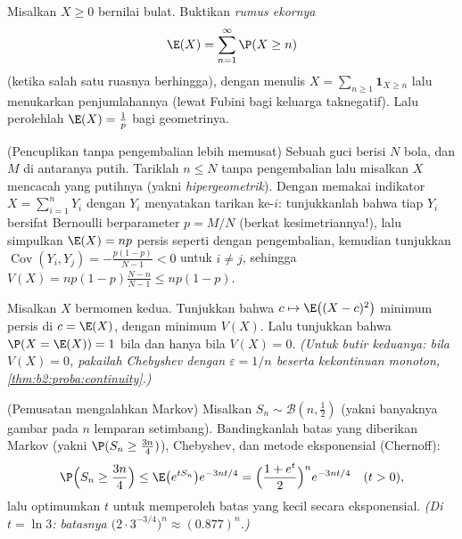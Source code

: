 \begin{exercise}[$\star\star$]\label{exo:b2:randomvar:4}
Misalkan $X \geq 0$ bernilai bulat. Buktikan \emph{rumus ekornya}
\[
\E(X) = \sum_{n=1}^{\infty} \P(X \geq n)
\]
(ketika salah satu ruasnya berhingga), dengan menulis $X =
\sum_{n\geq1}\mathbf{1}_{X \geq n}$ lalu menukarkan penjumlahannya
(lewat Fubini bagi keluarga taknegatif). Lalu perolehlah $\E(X) = \frac1p$ bagi
 geometrinya.
\end{exercise}

\begin{exercise}[$\star\star$]\label{exo:b2:randomvar:5}
(Pencuplikan tanpa pengembalian lebih memusat) Sebuah guci berisi $N$
bola, dan $M$ di antaranya putih. Tariklah $n \leq N$ tanpa pengembalian lalu
misalkan $X$ mencacah yang putihnya (yakni  \emph{hipergeometrik}). Dengan memakai
indikator $X = \sum_{i=1}^n Y_i$ dengan $Y_i$ menyatakan tarikan ke-$i$:
tunjukkanlah bahwa tiap $Y_i$ bersifat Bernoulli berparameter $p = M/N$ (berkat kesimetriannya!),
lalu simpulkan $\E(X) = np$ persis seperti dengan pengembalian, kemudian tunjukkan
$\operatorname{Cov}(Y_i, Y_j) = -\frac{p(1-p)}{N-1} < 0$ untuk $i
\neq j$, sehingga $V(X) = np(1-p)\frac{N - n}{N - 1} \leq np(1-p)$.
\end{exercise}

\begin{exercise}[$\star\star$]\label{exo:b2:randomvar:6}
Misalkan $X$ bermomen kedua. Tunjukkan bahwa $c \mapsto \E\bigl((X -
c)^2\bigr)$ minimum persis di $c = \E(X)$, dengan minimum
$V(X)$. Lalu tunjukkan bahwa $\P(X = \E(X)) = 1$ bila dan hanya bila $V(X) =
0$. \emph{(Untuk butir keduanya: bila $V(X) = 0$, pakailah Chebyshev
dengan $\varepsilon = 1/n$ beserta kekontinuan monoton,
\cref{thm:b2:proba:continuity}.)}
\end{exercise}

\begin{exercise}[$\star\star\star$]\label{exo:b2:randomvar:7}
(Pemusatan mengalahkan Markov) Misalkan $S_n \sim \mathcal{B}(n,
\frac12)$ (yakni banyaknya gambar pada $n$ lemparan setimbang). Bandingkanlah
batas yang diberikan Markov (yakni $\P(S_n \geq \frac{3n}{4})$), Chebyshev,
dan metode eksponensial (Chernoff):
\[
\P\Bigl(S_n \geq \frac{3n}4\Bigr)
\leq \E\bigl(e^{tS_n}\bigr)e^{-3nt/4}
= \Bigl(\frac{1 + e^t}{2}\Bigr)^n e^{-3nt/4}
\quad (t > 0),
\]
lalu optimumkan $t$ untuk memperoleh batas yang kecil secara eksponensial. \emph{(Di
$t = \ln 3$: batasnya $\bigl(2\cdot 3^{-3/4}\bigr)^n \approx
(0.877)^n$.)}
\end{exercise}


